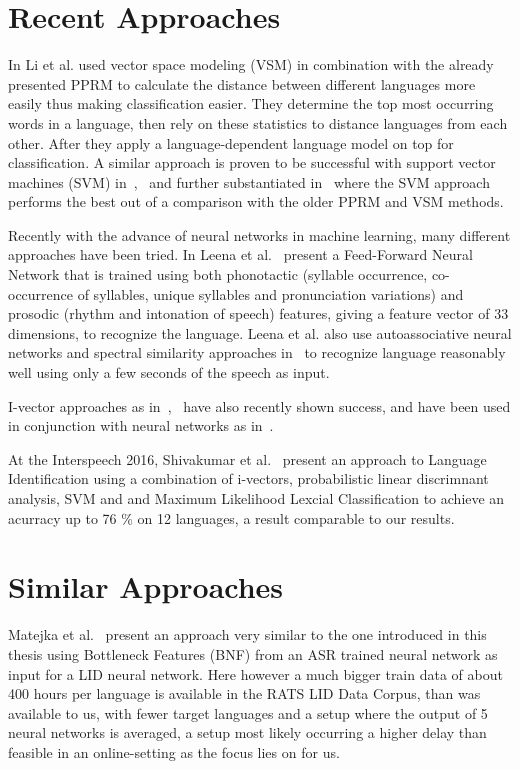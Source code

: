 \section{Recent Approaches}
In \cite{4032773} Li et al. used vector space modeling (VSM) in combination with the already presented PPRM to calculate the distance between different languages more easily thus making classification easier. They determine the top most occurring words in a language, then rely on these statistics to distance languages from each other. After they apply a language-dependent language model on top for classification. A similar approach is proven to be successful with support vector machines (SVM) in~\cite{4590023},~\cite{6289007} and further substantiated in~\cite{ma2006comparative} where the SVM approach performs the best out of a comparison with the older PPRM and VSM methods.
\par
Recently with the advance of neural networks in machine learning, many different approaches have been tried. In Leena et al.~\cite{1529486} present a Feed-Forward Neural Network that is trained using both phonotactic (syllable occurrence, co-occurrence of syllables, unique syllables and pronunciation variations) and prosodic (rhythm and intonation of speech) features, giving a feature vector of 33 dimensions, to recognize the language. Leena et al. also use autoassociative neural networks and spectral similarity approaches in~\cite{1287674} to recognize language reasonably well using only a few seconds of the speech as input.

\par

I-vector approaches as in~\cite{6680440},~\cite{d2012phonotactic} have also recently shown success, and have been used in conjunction with neural networks as in~\cite{song2015deep}.

At the Interspeech 2016, Shivakumar et al.~\cite{Shivakumar+2016} present an approach to Language Identification using a combination of i-vectors, probabilistic linear discrimnant analysis, SVM and  and Maximum Likelihood Lexcial Classification to achieve an acurracy up to 76 \% on 12 languages, a result comparable to our results.

\section{Similar Approaches}
Matejka et al.~\cite{matejka2014neural} present an approach very similar to the one introduced in this thesis using Bottleneck Features (BNF) from an ASR trained neural network as input for a LID neural network. Here however a much bigger train data of about 400 hours per language is available in the RATS LID Data Corpus, than was available to us, with fewer target languages and a setup where the output of 5 neural networks is averaged, a setup most likely occurring a higher delay than feasible in an online-setting as the focus lies on for us.

